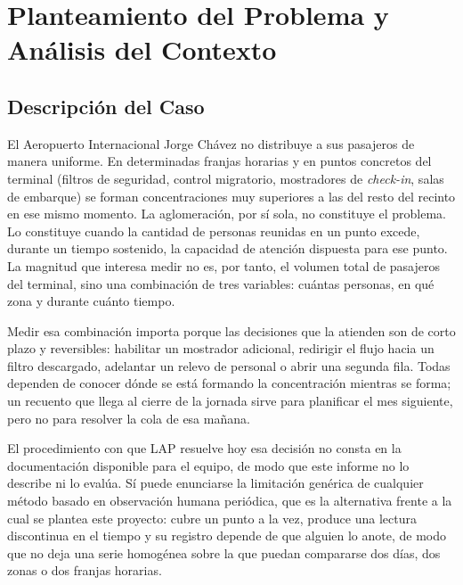 \section{Planteamiento del Problema y Análisis del Contexto}
\label{sec:planteamiento}

\subsection{Descripción del Caso}
\label{subsec:descripcion-caso}

El Aeropuerto Internacional Jorge Chávez no distribuye a sus pasajeros de manera
uniforme. En determinadas franjas horarias y en puntos concretos del terminal (filtros de
seguridad, control migratorio, mostradores de \emph{check-in}, salas de embarque) se forman
concentraciones muy superiores a las del resto del recinto en ese mismo momento. La
aglomeración, por sí sola, no constituye el problema. Lo constituye cuando la cantidad de
personas reunidas en un punto excede, durante un tiempo sostenido, la capacidad de atención
dispuesta para ese punto. La magnitud que interesa medir no es, por tanto, el volumen total de
pasajeros del terminal, sino una combinación de tres variables: cuántas personas, en qué zona
y durante cuánto tiempo.

Medir esa combinación importa porque las decisiones que la atienden son de corto plazo y
reversibles: habilitar un mostrador adicional, redirigir el flujo hacia un filtro descargado,
adelantar un relevo de personal o abrir una segunda fila. Todas dependen de conocer dónde se
está formando la concentración mientras se forma; un recuento que llega al cierre de la jornada
sirve para planificar el mes siguiente, pero no para resolver la cola de esa mañana.

El procedimiento con que LAP resuelve hoy esa decisión no consta en la documentación
disponible para el equipo, de modo que este informe no lo describe ni lo
evalúa. Sí
puede enunciarse la limitación genérica de cualquier método basado en observación humana
periódica, que es la alternativa frente a la cual se plantea este proyecto: cubre un punto a la vez,
produce una lectura discontinua en el tiempo y su registro depende de que alguien lo anote, de
modo que no deja una serie homogénea sobre la que puedan compararse dos días, dos zonas o
dos franjas horarias.

